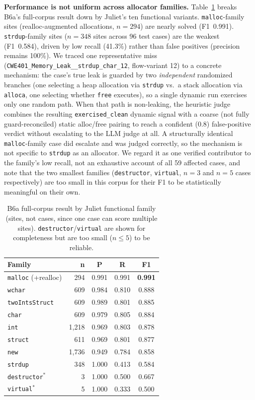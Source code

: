 \documentclass[11pt,a4paper]{article}
\begin{document}
\textbf{Performance is not uniform across allocator families.}
Table~\ref{tab:family} breaks B6a's full-corpus result down by Juliet's ten
functional variants. \texttt{malloc}-family sites (realloc-augmented
allocations, $n{=}294$) are nearly solved (F1~0.991). \texttt{strdup}-family
sites ($n{=}348$ sites across 96 test cases) are the weakest (F1~0.584),
driven by low recall (41.3\%) rather than false positives (precision
remains 100\%). We traced
one representative miss (\texttt{CWE401\_Memory\_Leak\_\_strdup\_char\_12},
flow-variant 12) to a concrete mechanism: the case's true leak is guarded
by two \emph{independent} randomized branches (one selecting a heap
allocation via \texttt{strdup} vs.\ a stack allocation via \texttt{alloca},
one selecting whether \texttt{free} executes), so a single dynamic run
exercises only one random path. When that path is non-leaking, the
heuristic judge combines the resulting \texttt{exercised\_clean} dynamic
signal with a coarse (not fully guard-reconciled) static alloc/free pairing
to reach a confident (0.8) false-positive verdict without escalating to
the LLM judge at all. A structurally identical \texttt{malloc}-family case
did escalate and was judged correctly, so the mechanism is not specific to
\texttt{strdup} as an allocator. We regard it as one verified contributor
to the family's low recall, not an exhaustive account of all 59 affected
cases, and note that the two smallest families (\texttt{destructor},
\texttt{virtual}, $n{=}3$ and $n{=}5$ cases respectively) are too small in
this corpus for their F1 to be statistically meaningful on their own.

\begin{table}[htbp]
\centering
\caption{B6a full-corpus result by Juliet functional family (sites, not
cases, since one case can score multiple sites). \texttt{destructor}/\texttt{virtual}
are shown for completeness but are too small ($n\le5$) to be reliable.}
\label{tab:family}
\small
\begin{tabular}{@{}lrccc@{}}
\toprule
\textbf{Family} & \textbf{n} & \textbf{P} & \textbf{R} & \textbf{F1} \\
\midrule
\texttt{malloc} (+realloc) & 294 & 0.991 & 0.991 & \textbf{0.991} \\
\texttt{wchar} & 609 & 0.984 & 0.810 & 0.888 \\
\texttt{twoIntsStruct} & 609 & 0.989 & 0.801 & 0.885 \\
\texttt{char} & 609 & 0.979 & 0.805 & 0.884 \\
\texttt{int} & 1{,}218 & 0.969 & 0.803 & 0.878 \\
\texttt{struct} & 611 & 0.969 & 0.801 & 0.877 \\
\texttt{new} & 1{,}736 & 0.949 & 0.784 & 0.858 \\
\texttt{strdup} & 348 & 1.000 & 0.413 & 0.584 \\
\texttt{destructor}$^{\ast}$ & 3 & 1.000 & 0.500 & 0.667 \\
\texttt{virtual}$^{\ast}$ & 5 & 1.000 & 0.333 & 0.500 \\
\bottomrule
\end{tabular}
\end{table}
\end{document}
